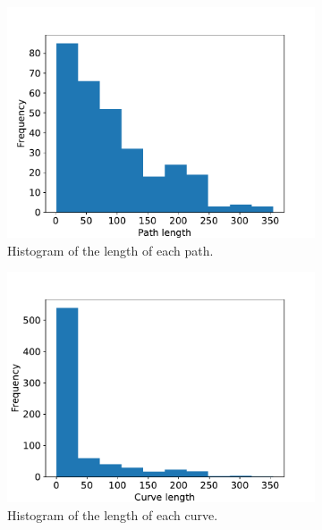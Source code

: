 \begin{figure}
    \centering
    \begin{subfigure}{.5\textwidth}
    \centering
    \includegraphics[width=\textwidth]{graphics/data_stats/path_len.pdf}
    \caption{Histogram of the length of each path.}
    \label{fig:path_len}
\end{subfigure}%
    \begin{subfigure}{.5\textwidth}
    \centering
    \includegraphics[width=\textwidth]{graphics/data_stats/curve_len.pdf}
    \caption{Histogram of the length of each curve.}
    \label{fig:curve_len}
\end{subfigure}
    \begin{subfigure}{.5\textwidth}

\end{subfigure}
\end{figure}
